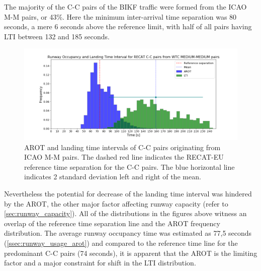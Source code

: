 The majority of the C-C pairs of the BIKF traffic were formed from the ICAO M-M pairs, or 43\%. Here the minimum inter-arrival time separation was 80 seconds, a mere 6 seconds above the reference limit, with half of all pairs having LTI between 132 and 185 seconds.

\begin{figure}[h]
    \centering
    \includegraphics[width=1\textwidth]{graphics/fig_CC_from_MM_pairs_time_sep.png}
    \caption[AROT and LTI of C-C pairs originating from ICAO M-M pairs]{AROT and landing time intervals of C-C pairs originating from ICAO M-M pairs. The dashed red line indicates the RECAT-EU reference time separation for the C-C pairs. The blue horizontal line indicates 2 standard deviation left and right of the mean.}
    \label{fig:CC_from_MM_pairs_time_sep}
\end{figure}

Nevertheless the potential for decrease of the landing time interval was hindered by the AROT, the other major factor affecting runway capacity (refer to \ref{sec:runway_capacity}). All of the distributions in the figures above witness an overlap of the reference time separation line and the AROT frequency distribution. The average runway occupancy time was estimated as 77,5 seconds (\ref{ssec:runway_usage_arot}) and compared to the reference time line for the predominant C-C pairs (74 seconds), it is apparent that the AROT is the limiting factor and a major constraint for shift in the LTI distribution.









